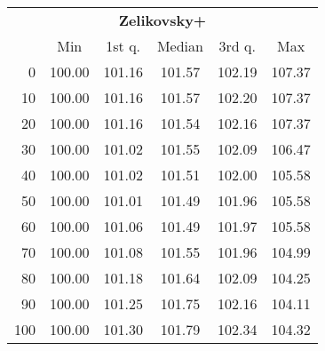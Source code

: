 \begin{tabular}{r|ccccc}
  \multicolumn{6}{c}{{\bf Zelikovsky+}} \\
  & Min & 1st q. & Median & 3rd q. & Max \\ \hline\hline
  0 & 100.00 & 101.16 & 101.57 & 102.19 & 107.37
\\ 10 & 100.00 & 101.16 & 101.57 & 102.20 & 107.37
\\ 20 & 100.00 & 101.16 & 101.54 & 102.16 & 107.37
\\ 30 & 100.00 & 101.02 & 101.55 & 102.09 & 106.47
\\ 40 & 100.00 & 101.02 & 101.51 & 102.00 & 105.58
\\ 50 & 100.00 & 101.01 & 101.49 & 101.96 & 105.58
\\ 60 & 100.00 & 101.06 & 101.49 & 101.97 & 105.58
\\ 70 & 100.00 & 101.08 & 101.55 & 101.96 & 104.99
\\ 80 & 100.00 & 101.18 & 101.64 & 102.09 & 104.25
\\ 90 & 100.00 & 101.25 & 101.75 & 102.16 & 104.11
\\ 100 & 100.00 & 101.30 & 101.79 & 102.34 & 104.32
\end{tabular}
